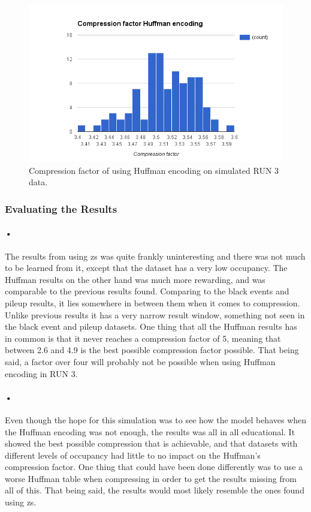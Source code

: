 \documentclass[a4paper, 12pt, openright, twoside]{report}
\begin{document}
\begin{figure}[h!]
	\centering
		\includegraphics[width=1.0\textwidth]{images/huffman-comp-fake-pileup.png}
		\caption{Compression factor of using Huffman encoding on simulated RUN 3 data.}
		\label{fig:compression-factor-huffman-synt}
\end{figure}

\subsubsection{Evaluating the Results}

\paragraph{•}
The results from using \gls{zs} was quite frankly uninteresting and there was not much to be learned from it, except that the dataset has a very low occupancy.
The Huffman results on the other hand was much more rewarding, and was comparable to the previous results found.
Comparing to the black events and pileup results, it lies somewhere in between them when it comes to compression.
Unlike previous results it has a very narrow result window, something not seen in the black event and pileup datasets.
One thing that all the Huffman results has in common is that it never reaches a compression factor of 5, meaning that between 2.6 and 4.9 is the best possible compression factor possible.
That being said, a factor over four will probably not be possible when using Huffman encoding in RUN 3.

\paragraph{•}
Even though the hope for this simulation was to see how the model behaves when the Huffman encoding was not enough, the results was all in all educational.
It showed the best possible compression that is achievable, and that datasets with different levels of occupancy had little to no impact on the Huffman's compression factor.
One thing that could have been done differently was to use a worse Huffman table when compressing in order to get the results missing from all of this.
That being said, the results would most likely resemble the ones found using \gls{zs}.
\end{document}
